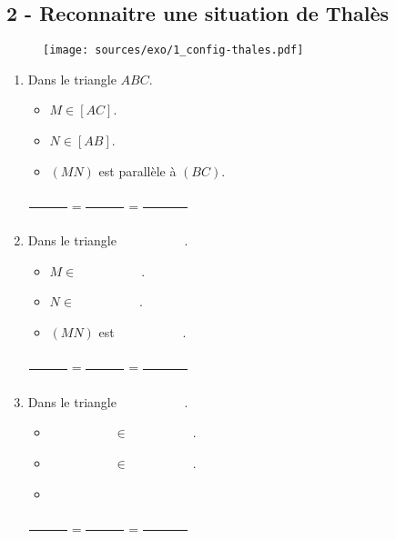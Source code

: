 \documentclass[11pt]{article}
\begin{document}
\vspace{2cm}
\subsection*{2 - Reconnaitre une situation de Thalès}

\begin{figure}[H]
  \centering
  \texttt{[image: sources/exo/1\_config-thales.pdf]}
\end{figure}

\begin{multicols}{3}
\begin{enumerate}
\item Dans le triangle $ABC$.

  \begin{itemize}
  \item $M \in [AC]$.
  \item $N \in [AB]$.
  \item $(MN)$ est parallèle à $(BC)$.
  \end{itemize}
  
  $\dfrac{\phantom{123456}}{\phantom{123456}} = \dfrac{\phantom{123456}}{\phantom{123456}} = \dfrac{\phantom{1234567}}{\phantom{123456}} $

\item Dans le triangle $\phantom{1234567890}$.
  \begin{itemize}
  \item $M \in \phantom{1234567890}$.
  \item $N \in \phantom{1234567890}$.
  \item $(MN)$ est $\phantom{1234567890}$.
  \end{itemize}

  $\dfrac{\phantom{123456}}{\phantom{123456}} = \dfrac{\phantom{123456}}{\phantom{123456}} = \dfrac{\phantom{1234567}}{\phantom{123456}} $

\item Dans le triangle $\phantom{1234567890}$.
  \begin{itemize}   
  \item $\phantom{1234567890} \in \phantom{1234567890}$.
  \item $\phantom{1234567890} \in \phantom{1234567890}$.
  \item \phantom{123456}
  \end{itemize}

  $\dfrac{\phantom{123456}}{\phantom{123456}} = \dfrac{\phantom{123456}}{\phantom{123456}} = \dfrac{\phantom{1234567}}{\phantom{123456}} $ 
\end{enumerate}
\end{multicols}
\end{document}
